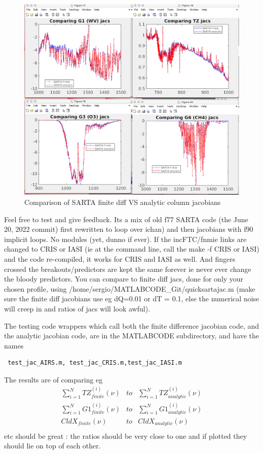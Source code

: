 \documentclass[11pt]{article}
\newcommand{\sa}{\textsf{SARTA}\xspace}
\begin{document}
\begin{figure}[ht] \centering
   \includegraphics[width=.75\textwidth]{compare_finite_diff.png}
\caption{Comparison of \sa finite diff VS analytic column jacobians}
\label{fig:fig3}
\end{figure}

Feel free to test and give feedback. Its a mix of old f77 \sa code
(the June 20, 2022 commit) first rewritten to loop over ichan) and
then jacobians with f90 implicit loops. No modules (yet, dunno if
ever). If the incFTC/fnmie links are changed to CRIS or IASI (ie at
the command line, call the make -f CRIS or IASI) and the code
re-compiled, it works for CRIS and IASI as well. And fingers crossed
the breakouts/predictors are kept the same forever ie never ever
change the bloody predictors.  You can compare to finite diff jacs,
done for only your chosen profile, using
/home/sergio/MATLABCODE\_Git/quicksartajac.m (make sure the finite
diff jacobians use eg dQ=0.01 or dT = 0.1, else the numerical noise
will creep in and ratios of jacs will look awful).  

The testing code wrappers which call both the finite difference
jacobian code, and the analytic jacobian code, are in the MATLABCODE
subdirectory, and have the names
\begin{verbatim} test_jac_AIRS.m, test_jac_CRIS.m,test_jac_IASI.m 
\end{verbatim}
The results are of comparing eg 
\begin{eqnarray*}
\sum_{i=1}^N TZ^{(i)}_{finite}(\nu) & to & \sum_{i=1}^N TZ^{(i)}_{analytic}(\nu) \\
\sum_{i=1}^N G1^{(i)}_{finite}(\nu) & to & \sum_{i=1}^N G1^{(i)}_{analytic}(\nu) \\
CldX_{finite}(\nu) & to & CldX_{analytic}(\nu) \\
\end{eqnarray*}
etc should be great : the ratios should be very close to one and if
plotted they should lie on top of each other.
\end{document}
